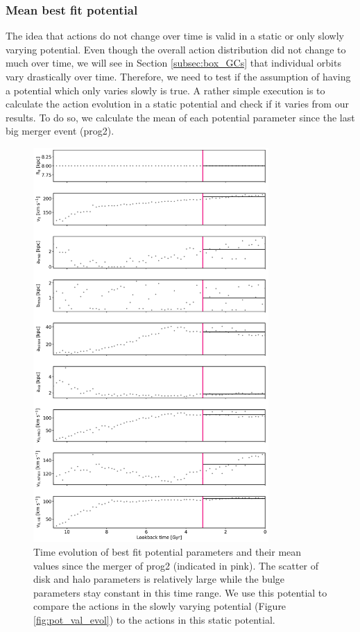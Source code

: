\subsubsection{Mean best fit potential}\label{subsubsec:GCs_actions_time_mean_right_pot}
The idea that actions do not change over time is valid in a static or only slowly varying potential. Even though the overall action distribution did not change to much over time, we will see in Section \ref{subsec:box_GCs} that individual orbits vary drastically over time. Therefore, we need to test if the assumption of having a potential which only varies slowly is true. A rather simple execution is to calculate the action evolution in a static potential and check if it varies from our results. To do so, we calculate the mean of each potential parameter since the last big merger event (prog2). 
\begin{figure}[htbp]
\captionsetup{format=plain}
    \centering
	\includegraphics[width=0.8\textwidth]{plots/Dynamics/mean_pot/potential_evolution_with_mean_jan19.png}
    \caption{Time evolution of best fit potential parameters and their mean values since the merger of prog2 (indicated in pink). The scatter of disk and halo parameters is relatively large while the bulge parameters stay constant in this time range. We use this potential to compare the actions in the slowly varying potential (Figure \ref{fig:pot_val_evol}) to the actions in this static potential.}\label{fig:potential_mean_evolution}
\end{figure}
